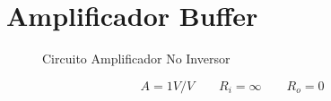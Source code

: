 \chapter{Amplificador Buffer}

\begin{figure}[ht]
	\begin{center}
		
	\caption{Circuito Amplificador No Inversor}
	\label{fig:buffer}
	\end{center}
\end{figure}

\begin{equation}
A = 1 V/V \qquad R_i=\infty \qquad R_o=0
\end{equation}